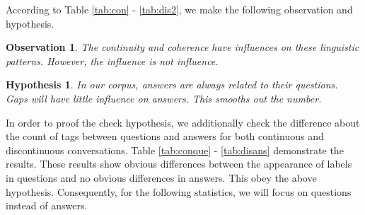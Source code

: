 \documentclass[bsc,frontabs,twoside,singlespacing,parskip,deptreport]{infthesis}     %
\newtheorem{observation}{Observation}[chapter]
\newtheorem{hypo}{Hypothesis}[chapter]
\begin{document}
According to Table \ref{tab:con} - \ref{tab:dis2}, we make the following observation and hypothesis.

\begin{observation}
The continuity and coherence have influences on these linguistic patterns. However, the influence is not influence.
\end{observation} 

\begin{hypo}
In our corpus, answers are always related to their questions. Gaps will have little influence on answers. This smooths out the number.
\end{hypo}



In order to proof the check hypothesis, we additionally check the difference about the count of tags between questions and answers for both continuous and discontinuous conversations. Table \ref{tab:conque} - \ref{tab:disans} demonstrate the results. These results show obvious differences between the appearance of labels in questions and no obvious differences in answers. This obey the above hypothesis. Consequently, for the following statistics, we will focus on questions instead of answers.
\end{document}

